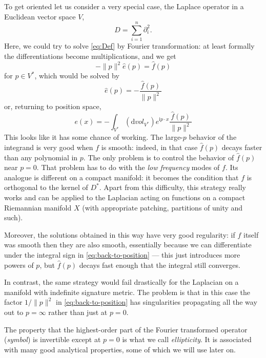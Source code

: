 \documentclass[12pt,letterpaper,reqno]{article}
\numberwithin{equation}{section}
\newcommand{\I}{{\mathrm i}}
\newcommand{\de}{\mathrm{d}}
\newcommand{\norm}[1]{\lVert#1\rVert}
\newcommand{\ti}[1]{\textit{#1}}
\begin{document}
To get oriented let us consider a very special case,
the Laplace operator in a Euclidean vector space $V$,
\begin{equation}
  D = \sum_{i=1}^n \partial_i^2.
\end{equation}
Here, we could try to solve \eqref{eq:Def}
by Fourier transformation:
at least formally the differentiations
become multiplications, and we get
\begin{equation}
  -\norm{p}^2 \hat{e}(p) = \hat{f}(p)
\end{equation}
for $p \in V^*$, which would be solved by
\begin{equation}
  \hat e(p) = -\frac{\hat{f}(p)}{\norm{p}^2}
\end{equation}
or, returning to position space,
\begin{equation} \label{eq:back-to-position}
  e(x) = -\int_{V^*} (\de vol_{V^*}) e^{\I p \cdot x} \frac{\hat{f}(p)}{\norm{p}^2}
\end{equation}
This looks like it has some chance of working.
The large-$p$ behavior of the integrand is very good when $f$
is smooth: indeed, in that case $\hat f(p)$ decays faster
than any polynomial in $p$.
The only problem is to control 
the behavior of $\hat f(p)$ near $p=0$.
That problem has to do with the \ti{low frequency} modes of $f$. 
Its analogue is different on a compact manifold: it becomes the
condition that $f$ is orthogonal to the kernel of $D^*$. Apart
from this difficulty, this strategy really works and can be applied 
to the Laplacian acting on functions on a compact Riemannian manifold $X$ 
(with appropriate patching, partitions of unity and
such).

Moreover, the solutions obtained in this 
way have very good regularity: if $f$ itself was smooth then they are also 
smooth, essentially because we can differentiate under the integral sign in 
\eqref{eq:back-to-position} --- this just introduces more powers of
$p$, but $\hat f(p)$ decays fast enough that the integral still
converges.

In contrast, the same strategy would fail drastically for the 
Laplacian on a manifold with indefinite signature metric.
The problem is that in this case the factor $1 / \norm{p}^2$
in \eqref{eq:back-to-position} has singularities propagating
all the way out to $p = \infty$ rather than just at $p=0$.

The property that the highest-order part of the 
Fourier transformed operator (\ti{symbol}) is invertible except
at $p=0$ is what we call \ti{ellipticity}. It is associated
with many good analytical properties, some of which we will
use later on.
\end{document}
